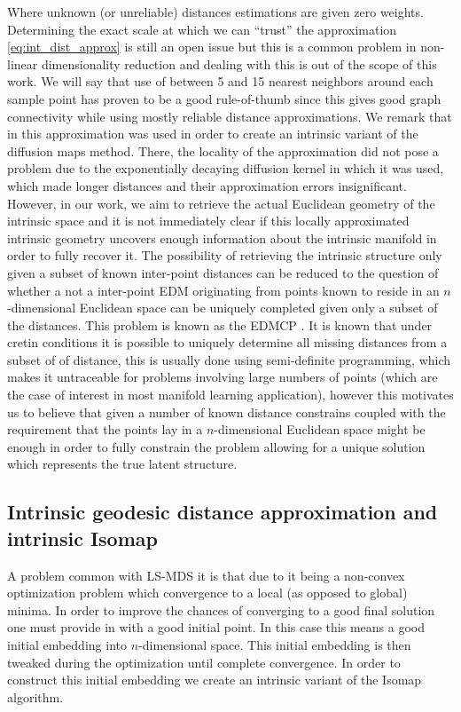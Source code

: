 	Where unknown (or unreliable) distances estimations are given zero weights. Determining the exact scale at which we can ``trust'' the approximation \cref{eq:int_dist_approx} is still an open issue but this is a common problem in non-linear dimensionality reduction and dealing with this is out of the scope of this work. We will say that use of between 5 and 15 nearest neighbors around each sample point has proven to be a good rule-of-thumb since this gives good graph connectivity while using mostly reliable distance approximations. We remark that in \cite{singer2008non} this approximation was used in order to create an intrinsic variant of the diffusion maps method. There, the locality of the approximation did not pose a problem due to the exponentially decaying diffusion kernel in which it was used, which made longer distances and their approximation errors insignificant. However, in our work, we aim to retrieve the actual Euclidean geometry of the intrinsic space and it is not immediately clear if this locally approximated intrinsic geometry uncovers enough information about the intrinsic manifold in order to fully recover it. The possibility of retrieving the intrinsic structure only given a subset of known inter-point distances can be reduced to the question of whether a not a inter-point \ac{EDM} originating from points known to reside in an $n$-dimensional Euclidean space can be uniquely completed given only a subset of the distances. This problem is known as the \ac{EDMCP} \cite{alfakih1999solving,fang2012euclidean}. It is known that under cretin conditions it is possible to uniquely determine all missing distances from a subset of of distance, this is usually done using semi-definite programming, which makes it untraceable for problems involving large numbers of points (which are the case of interest in most manifold learning application), however this motivates us to believe that given a number of known distance constrains coupled with the requirement that the points lay in a $n$-dimensional Euclidean space might be enough in order to fully constrain the problem allowing for a unique solution which represents the true latent structure.
	
	\subsection{Intrinsic geodesic distance approximation and intrinsic Isomap}
	\label{ssec:Global-geometry-approximation}
	
	A problem common with \ac{LS-MDS} it is that due to it being a non-convex optimization problem which convergence to a local (as opposed to global) minima. In order to improve the chances of converging to a good final solution one must provide in with a good initial point. In this case this means a good initial embedding into $n$-dimensional space. This initial embedding is then tweaked during the optimization until complete convergence. In order to construct this initial embedding we create an intrinsic variant of the Isomap algorithm.
	
